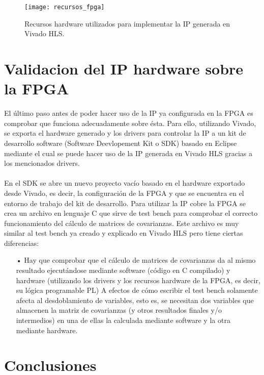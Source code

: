 \begin{figure}
\centering
\texttt{[image: recursos\_fpga]}
\caption{Recursos hardware utilizados para implementar la IP generada en Vivado HLS.}\label{fig:recursos_fpga}
\end{figure}

\section{Validacion del IP hardware sobre la FPGA}
El último paso antes de poder hacer uso de la IP ya configurada en la FPGA es comprobar que funciona adecuadamente sobre ésta. Para ello, utilizando Vivado, se exporta el hardware generado y los drivers para controlar la IP a un kit de desarrollo software (Software Deevlopement Kit o SDK) basado en Eclipse mediante el cual se puede hacer uso de la IP generada en Vivado HLS gracias a los mencionados drivers. 
\\
\\
En el SDK se abre un nuevo proyecto vacío basado en el hardware exportado desde Vivado, es decir, la configuración de la FPGA y que se encuentra en el entorno de trabajo del kit de desarrollo. Para utilizar la IP cobre la FPGA se crea un archivo en lenguaje C que sirve de test bench para comprobar el correcto funcionamiento del cálculo de matrices de covarianzas. Este archivo es muy similar al test bench ya creado y explicado en Vivado HLS pero tiene ciertas diferencias:

\begin{itemize}
\item[•] Hay que comprobar que el cálculo de matrices de covarianzas da al mismo resultado ejecutándose mediante software (código en C compilado) y hardware (utilizando los drivers y los recursos hardware de la FPGA, es decir, su lógica programable PL) A efectos de cómo escribir el test bench solamente afecta al desdoblamiento de variables, esto es, se necesitan dos variables que almacenen la matriz de covarianzas (y otros resultados finales y/o intermedios) en una de ellas la calculada mediante software y la otra mediante hardware.
\end{itemize} 


\section{Conclusiones}



